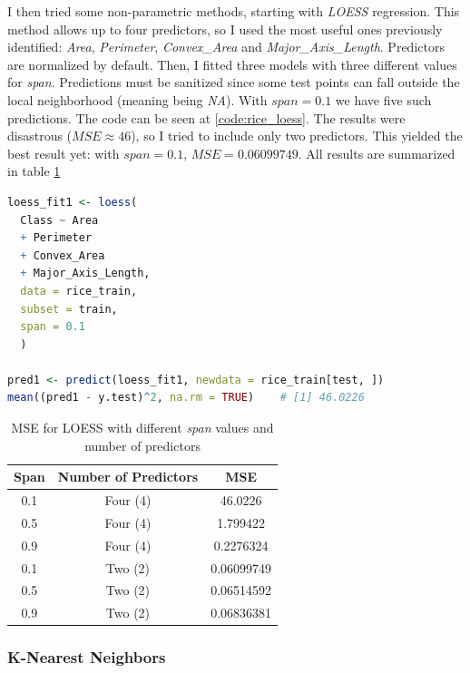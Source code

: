 I then tried some non-parametric methods, starting with \textit{LOESS} regression. This method allows up to four predictors, so I used the most useful ones previously identified: \textit{Area}, \textit{Perimeter}, \textit{Convex\_Area} and \textit{Major\_Axis\_Length}. Predictors are normalized by default. Then, I fitted three models with three different values for \textit{span}. Predictions must be sanitized since some test points can fall outside the local neighborhood (meaning being \textit{NA}). With $span = 0.1$ we have five such predictions. The code can be seen at \ref{code:rice_loess}. The results were disastrous ($MSE \approx 46$), so I tried to include only two predictors. This yielded the best result yet: with $span = 0.1$, $MSE=0.06099749$. All results are summarized in table \ref{tab:rice_loess}

\begin{lstlisting}[language={R},label={code:rice_loess}, caption={LOESS regression on rice dataset with four predictors and $span=1$}]
loess_fit1 <- loess(
  Class ~ Area 
  + Perimeter 
  + Convex_Area 
  + Major_Axis_Length, 
  data = rice_train, 
  subset = train, 
  span = 0.1
  )

pred1 <- predict(loess_fit1, newdata = rice_train[test, ])
mean((pred1 - y.test)^2, na.rm = TRUE)    # [1] 46.0226
\end{lstlisting}

\begin{table}
  \centering
  \caption{MSE for LOESS with different \textit{span} values and number of predictors}
  \label{tab:rice_loess}
  \begin{tabularx}{.4\textwidth}{ccc}
    \toprule
    Span & Number of Predictors & MSE \\
    \midrule
    0.1 & Four (4) & 46.0226 \\
    0.5 & Four (4) & 1.799422 \\
    0.9 & Four (4) & 0.2276324 \\
    \midrule
    0.1 & Two (2) & 0.06099749 \\
    0.5 & Two (2) & 0.06514592 \\
    0.9 & Two (2) & 0.06836381 \\
    \bottomrule
  \end{tabularx}
\end{table}

\subsubsection{K-Nearest Neighbors}

